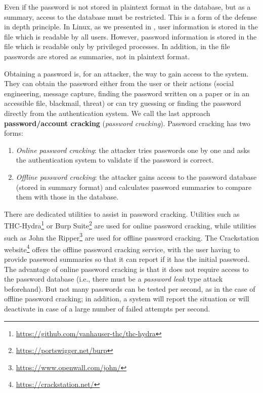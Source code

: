 Even if the password is not stored in plaintext format in the database, but as a summary, access to the database must be restricted.
This is a form of the defense in depth principle.
In Linux, as we presented in , user information is stored in the file  which is readable by all users.
However, password information is stored in the file  which is readable only by privileged processes.
In addition, in the file  passwords are stored as summaries, not in plaintext format.

Obtaining a password is, for an attacker, the way to gain access to the system.
They can obtain the password either from the user or their actions (social engineering, message capture, finding the password written on a paper or in an accessible file, blackmail, threat) or can try guessing or finding the password directly from the authentication system.
We call the last approach \textbf{password/account cracking} (\textit{password cracking}).
Password cracking has two forms:

\begin{enumerate}
  \item \textit{Online password cracking}: the attacker tries passwords one by one and asks the authentication system to validate if the password is correct.
  \item \textit{Offline password cracking}: the attacker gains access to the password database (stored in summary format) and calculates password summaries to compare them with those in the database.
\end{enumerate}

There are dedicated utilities to assist in password cracking.
Utilities such as THC-Hydra\footnote{\url{https://github.com/vanhauser-thc/thc-hydra}} or Burp Suite\footnote{\url{https://portswigger.net/burp}} are used for online password cracking, while utilities such as John the Ripper\footnote{\url{https://www.openwall.com/john/}} are used for offline password cracking.
The Crackstation website\footnote{\url{https://crackstation.net/}} offers the offline password cracking service, with the user having to provide password summaries so that it can report if it has the initial password.
The advantage of online password cracking is that it does not require access to the password database (i.e., there must be a \textit{password leak} type attack beforehand).
But not many passwords can be tested per second, as in the case of offline password cracking;
in addition, a system will report the situation or will deactivate in case of a large number of failed attempts per second.

